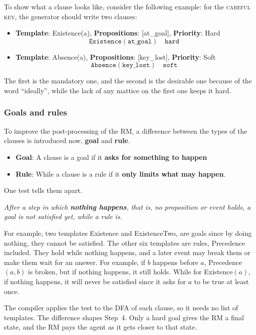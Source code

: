 \documentclass[11pt,english,listoffigures,listoftables]{tfgetsinf}
\newcommand{\runex}[1]{\textsc{#1}}  %
\newcommand{\keyidea}[1]{\par\smallskip\noindent\hspace*{0.6em}{\color{gray!55}\vrule width 1.5pt}\hspace{8pt}\parbox[t]{\dimexpr\linewidth-0.6em-9.5pt\relax}{\itshape #1}\par\smallskip}  %
\begin{document}
\noindent To show what a clause looks like, consider the following example: for the \runex{careful key}, the generator should write two clauses: 
\begin{itemize}
    \item \textbf{Template}: Existence(a), \textbf{Propositions}: [at\_goal], \textbf{Priority}: Hard 
    $$\texttt{Existence}(\texttt{at\_goal}) \quad \texttt{hard}$$
    \item \textbf{Template}: Absence(a), \textbf{Propositions}: [key\_lost], \textbf{Priority}: Soft 
    $$\texttt{Absence}(\texttt{key\_lost}) \quad \texttt{soft}$$
\end{itemize}
The first is the mandatory one, and the second is the desirable one because of the word ``ideally'', while the lack of any mattice on the first one keeps it hard.

\subsubsection{Goals and rules}
To improve the post-processing of the RM, a difference between the types of the clauses is introduced now, \textbf{goal} and \textbf{rule}. 

\begin{itemize}
    \item \textbf{Goal}: A clause is a goal if it \textbf{asks for something to happen}
    \item \textbf{Rule}: While a clause is a rule if it \textbf{only limits what may happen}. 
\end{itemize}
One test tells them apart. 
\keyidea{After a step in which \textbf{nothing happens}, that is, no proposition or event holds, a goal is not satisfied yet, while a rule is.} 

For example, two templates Existence and ExistenceTwo, are goals since by doing nothing, they cannot be satisfied. The other six templates are rules, Precedence included. They hold while nothing happens, and a later event may break them or make them wait for an answer. For example, if $b$ happens before $a$, Precedence$(a,b)$ is broken, but if nothing happens, it still holds. While for Existence$(a)$, if nothing happens, it will never be satisfied since it asks for $a$ to be true at least once.

The compiler applies the test to the DFA of each clause, so it needs no list of templates. The difference shapes Step~4. Only a hard goal gives the RM a final state, and the RM pays the agent as it gets closer to that state.
 
\end{document}
